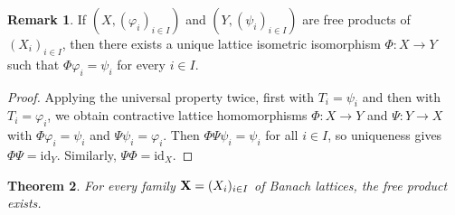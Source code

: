 \documentclass[12pt]{amsart}
\theoremstyle{plain}
\newtheorem{theorem}{Theorem}[section]
\theoremstyle{definition}
\newtheorem{remark}[theorem]{Remark}
\begin{document}
\begin{remark}
If $(X,(\varphi_i)_{i\in I})$ and $(Y,(\psi_i)_{i\in I})$ are free products of $(X_i)_{i\in I}$, then there exists a unique lattice isometric isomorphism $\Phi:X\to Y$ such that $\Phi\varphi_i=\psi_i$ for every $i\in I$.
\end{remark}

\begin{proof}
Applying the universal property twice, first with $T_i=\psi_i$ and then with $T_i=\varphi_i$, we obtain contractive lattice homomorphisms $\Phi:X\to Y$ and $\Psi:Y\to X$ with $\Phi\varphi_i=\psi_i$ and $\Psi\psi_i=\varphi_i$. Then $\Phi\Psi\psi_i=\psi_i$ for all $i\in I$, so uniqueness gives $\Phi\Psi=\mathrm{id}_Y$. Similarly, $\Psi\Phi=\mathrm{id}_X$.
\end{proof}

\begin{theorem}\label{thm:existence}
For every family $\bold{X}=(X_i)_{i\in I}$ of Banach lattices, the free product exists.
\end{theorem}
\end{document}
